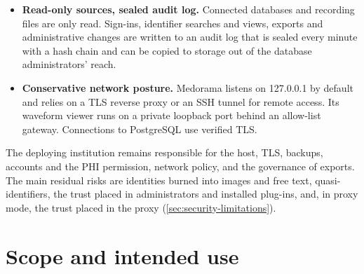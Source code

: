 \begin{itemize}
  endpoint that forgets the gate cannot leak identifiers. An end-to-end test seeds identifiers in
  every format and checks that no byte of any answer, file or export contains them.
\item \textbf{Read-only sources, sealed audit log.} Connected databases and recording files are
  only read. Sign-ins, identifier searches and views, exports and administrative changes are written to
  an audit log that is sealed every minute with a hash chain and can be copied to storage out of
  the database administrators' reach.
\item \textbf{Conservative network posture.} Medorama listens on 127.0.0.1 by default and relies
  on a TLS reverse proxy or an SSH tunnel for remote access. Its waveform viewer runs on a private
  loopback port behind an allow-list gateway. Connections to PostgreSQL use verified TLS.
\end{itemize}
The deploying institution remains responsible for the host, TLS, backups, accounts and the PHI
permission, network policy, and the governance of exports. The main residual risks are identities
burned into images and free text, quasi-identifiers, the trust placed in administrators and
installed plug-ins, and, in proxy mode, the trust placed in the proxy
(\cref{sec:security-limitations}).

\section{Scope and intended use}
\label{sec:security-scope}

